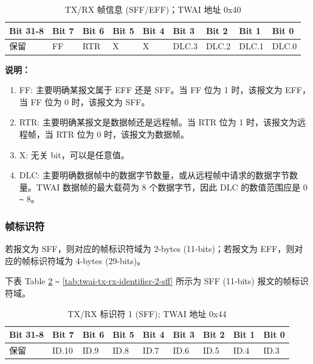 \documentclass[main\_\_CN.tex]{subfiles}
\begin{document}
\begin{longtable}[c]{|p{1.4cm}|p{1.4cm}|p{1.4cm}|p{1.4cm}|p{1.4cm}|p{1.4cm}|p{1.4cm}|p{1.4cm}|p{1.4cm}|}
    \caption{TX/RX 帧信息 (SFF/EFF)；TWAI 地址 0x40}
    \label{tab:twai-tx-rx-frame-info-sff-eff}\\
    \hline
       \rowcolor{lightgray}
    \textbf{Bit 31-8} & \textbf{Bit 7} & \textbf{Bit 6} & \textbf{Bit 5} & \textbf{Bit 4} & \textbf{Bit 3} & \textbf{Bit 2} & \textbf{Bit 1} & \textbf{Bit 0}\\\hline
    保留 & FF & RTR  & X  & X  & DLC.3 & DLC.2 & DLC.1 & DLC.0\\
    \hline
\end{longtable}
\vspace{-1.5em}
{\bfseries 说明：}\\
\begin{enumerate}
    \item FF: 主要明确某报文属于 EFF 还是 SFF。当 FF 位为 1 时，该报文为 EFF，当 FF 位为 0 时，该报文为 SFF。
    \item RTR: 主要明确某报文是数据帧还是远程帧。当 RTR 位为 1 时，该报文为远程帧，当 RTR 位为 0 时，该报文为数据帧。
    \item X: 无关 bit，可以是任意值。
    \item DLC: 主要明确数据帧中的数据字节数量，或从远程帧中请求的数据字节数量。TWAI 数据帧的最大载荷为 8 个数据字节，因此 DLC 的数值范围应是 0 \verb+~+ 8。
\end{enumerate}

\subsubsection{帧标识符}
若报文为 SFF，则对应的帧标识符域为 2-bytes (11-bits)；若报文为 EFF，则对应的帧标识符域为 4-bytes (29-bits)。

下表 Table \ref{tab:twai-tx-rx-identifier-1-sff} \verb+~+ \ref{tab:twai-tx-rx-identifier-2-sff} 所示为 SFF (11-bits) 报文的帧标识符域。

\begin{longtable}[c]{|p{1.4cm}|p{1.4cm}|p{1.4cm}|p{1.4cm}|p{1.4cm}|p{1.4cm}|p{1.4cm}|p{1.4cm}|p{1.4cm}|}
    \caption{TX/RX 标识符 1 (SFF); TWAI 地址 0x44}
    \label{tab:twai-tx-rx-identifier-1-sff}\\
    \hline
       \rowcolor{lightgray}
    \textbf{Bit 31-8} & \textbf{Bit 7} & \textbf{Bit 6} & \textbf{Bit 5} & \textbf{Bit 4} & \textbf{Bit 3} & \textbf{Bit 2} & \textbf{Bit 1} & \textbf{Bit 0}\\\hline
    保留 & ID.10 & ID.9 & ID.8 & ID.7 & ID.6 & ID.5 & ID.4 & ID.3\\
    \hline
\end{longtable}
\end{document}
